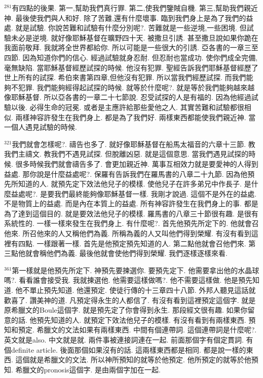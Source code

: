 \documentclass{book}
\begin{document}
$^{281}$有四點的後果.
第一,幫助我們真行罪.
第二,使我們鑒賊自機.
第三,幫助我們親近神.
最後使我們與人和好.
除了苦難,還有什麼壞事.
臨到我們身上是為了我們的益處.
就是試驗.
你說苦難和試驗有什麼分別呢?.
苦難就是一些逆境,一些困境.
但試驗未必是逆境.
就好像耶穌基督在曠野四十天.
被撒旦引誘.
甚至撒旦說如果你跪在我面前敬拜.
我就將全世界都給你.
所以可能是一些很大的引誘.
亞各書的一章三至四節.
因為知道你們的信心.
經過試驗就身忍耐.
但忍耐也當成功.
使你們成全完備,毫無缺陷.
當耶穌基督經歷試探的時候.
他沒有犯罪.
聖經告訴我們耶穌基督經歷了世上所有的試探.
希伯來書第四章,但他沒有犯罪.
所以當我們經歷試探.
而我們能夠不犯罪.
我們能夠經得起試探的時候.
就等於什麼呢?.
就是等於我們能夠越來越像耶穌基督.
所以亞各書的一章二十七節說.
忍受試探的人是有福的.
因為他經過試驗以後.
必得生命的冠冕.
或者是主應許給那些愛他之人.
其實苦難和試驗都很相似.
兩樣神容許發生在我們身上.
都是為了我們好.
兩樣東西都能使我們親近神.
當一個人遇見試驗的時候.

$^{321}$我們就會怎樣呢?.
禱告也多了.
就好像耶穌基督在船馬太福音的六章十三節.
教我們主禱文.
教我們不遇見試探.
但脫離凶惡.
就是這個意思.
當我們遇見試探的時候.
很多時候我們就會禱告多了.
會更加親近神.
萬事互相效力就是要愛神的人得到益處.
那你說是什麼益處呢?.
保羅有告訴我們在羅馬書的八章二十九節.
因為他預先所知道的人.
就預先定下效法他兒子的模樣.
使他兒子在許多弟兄中作長子.
是什麼益處呢?.
是要我們最終能夠像耶穌基督一樣.
我剛才說過.
這個不是外在的益處.
不是物質上的益處.
而是內在本質上的益處.
所有神容許發生在我們身上的事.
都是為了達到這個目的.
就是要效法他兒子的模樣.
羅馬書的八章三十節很有趣.
是很有系統性的.
一樣一樣來發生在我們身上.
有什麼呢?.
首先他預先所定下的.
他就會召他來.
所召他來的人又稱他們為義.
所稱為義的人又叫他們得到榮耀.
有沒有看到這裡有四點.
一樣跟著一樣.
首先是他預定預先知道的人.
第二點他就會召他們來.
第三點他就會稱他們為義.
最後他就會使他們得到榮耀.
我們逐樣逐樣來看.

$^{361}$第一樣就是他預先所定下.
神預先要揀選你.
要預先定下.
他需要拿出他的水晶球嗎?.
看看誰會接受我.
我就揀選他.
他需要這樣做嗎?.
他不需要這樣做.
他是預先知道.
他不單止預先知道.
他還預定.
使徒行傳的十三章四十八節.
外邦人聽見這話就歡喜了.
讚美神的道.
凡預定得永生的人都信了.
有沒有看到這裡預定這個字.
就是原希臘文的Boule這個字.
就是預先定了你會得到永生.
那段經文很有趣.
如果你留意的話.
他預先知道的人.
就預定下效法他兒子的模樣.
有沒有看到有兩樣東西.
預知和預定.
希臘文的文法如果有兩樣東西.
中間有個連帶詞.
這個連帶詞是什麼呢?.
英文就是also.
中文就是就.
兩件事被連接詞連在一起.
前面那個字有個定貫詞.
有個definite article.
後面那個如果沒有的話.
這兩樣東西都是相同.
都是說一樣的東西.
這個就是希臘文的文法.
所以神所預知的就等於他預定.
他所預定的就等於他預知.
希臘文的pronosis這個字.
是由兩個字加在一起.
\end{document}
